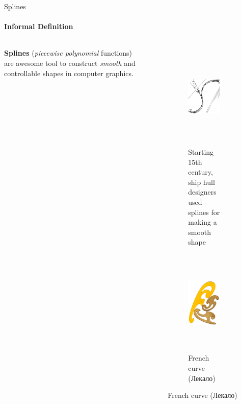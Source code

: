 \documentclass[aspectratio=169]{beamer}
\begin{document}
\begin{frame}[t]{Splines}
\framesubtitle{Informal Definition}
    \begin{columns}[T,onlytextwidth]
        \begin{column}{0.39\textwidth}
            \textbf{Splines} (\textit{piecewise polynomial} functions) are awesome tool to construct \textit{smooth} and controllable shapes in computer graphics.
        \end{column}
        \begin{column}{0.59\textwidth}
            \vspace{-1cm}
            \begin{figure}[H]
                \begin{subfigure}[b]{0.49\textwidth}
                    \centering\includegraphics[height=5cm,width=1\textwidth,keepaspectratio]{spline_ship.png}
                    \caption*{Starting 15th century, ship hull designers used splines for making a smooth shape}
                    \label{fig:spline_ship.png}
                \end{subfigure}
                \begin{subfigure}[b]{0.49\textwidth}
                    \centering\includegraphics[height=5cm,width=1\textwidth,keepaspectratio]{lekalo.jpg}
                    \caption*{French curve (Лекало)}
                    \label{fig:lekalo.jpg}
                \end{subfigure}
            \end{figure}
        \end{column}
    \end{columns}
\end{frame}
\end{document}
